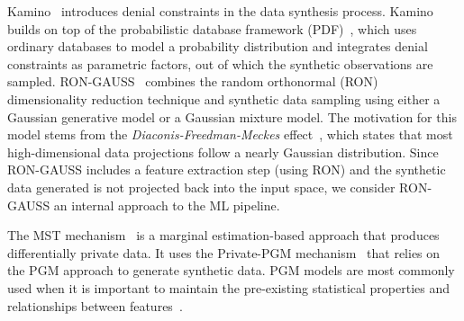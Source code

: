 \documentclass[parskip=full]{scrartcl}
\begin{document}
Kamino~\cite{ge2021kamino} introduces denial constraints in the data synthesis
process. Kamino builds on top of the probabilistic database framework
(PDF)~\cite{de2019formal, suciu2011probabilistic}, which uses ordinary
databases to model a probability distribution and integrates denial
constraints as parametric factors, out of which the synthetic observations are
sampled. RON-GAUSS~\cite{chanyaswad2019ron} combines the random orthonormal
(RON) dimensionality reduction technique and synthetic data sampling using
either a Gaussian generative model or a Gaussian mixture model. The motivation
for this model stems from the \textit{Diaconis-Freedman-Meckes}
effect~\cite{meckes2012projections}, which states that most high-dimensional
data projections follow a nearly Gaussian distribution. Since RON-GAUSS
includes a feature extraction step (using RON) and the synthetic data
generated is not projected back into the input space, we consider RON-GAUSS an
internal approach to the ML pipeline.

The MST mechanism~\cite{mckenna2021winning} is a marginal estimation-based
approach that produces differentially private data. It uses the Private-PGM
mechanism~\cite{mckenna2019graphical} that relies on the PGM approach to
generate synthetic data. PGM models are most commonly used when it is
important to maintain the pre-existing statistical properties and
relationships between features~\cite{young2009using}.

\end{document}
